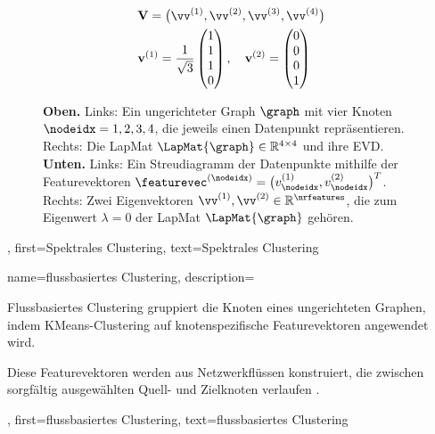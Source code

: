 {{{{{\begin{figure}[H]
\begin{center}
\begin{minipage}{0.4\textwidth}
				\end{minipage}
				\begin{minipage}{0.4\textwidth}
					\begin{align}
						& \mathbf{V} = \big( \vv^{(1)},\vv^{(2)},\vv^{(3)},\vv^{(4)} \big) \nonumber \\
						& \mathbf{v}^{(1)} = \frac{1}{\sqrt{3}} \begin{pmatrix} 1 \\ 1 \\ 1 \\ 0 \end{pmatrix}, \quad
						\mathbf{v}^{(2)} = \begin{pmatrix} 0 \\ 0 \\ 0 \\ 1 \end{pmatrix} \nonumber
					\end{align}
				\end{minipage}
				\caption{\label{fig_lap_mtx_specclustering_dict} 
					{\bf Oben.} Links: Ein ungerichteter \gls{Graph} $\graph$ mit vier Knoten $\nodeidx=1,2,3,4$, 
					die jeweils einen \gls{Datenpunkt} repräsentieren. Rechts: Die \gls{LapMat} 
					$\LapMat{\graph} \in \mathbb{R}^{4 \times 4}$ und ihre \gls{EVD}. 
					{\bf Unten.} Links: Ein \gls{Streudiagramm} der \gls{Datenpunkte} mithilfe der 
					\gls{Featurevektoren} $\featurevec^{(\nodeidx)} = \big( v^{(1)}_{\nodeidx}, v^{(2)}_{\nodeidx} \big)^T$. 
					Rechts: Zwei \gls{Eigenvektoren} $\vv^{(1)}, \vv^{(2)} \in \mathbb{R}^{\nrfeatures}$, 
					die zum \gls{Eigenwert} $\lambda = 0$ der \gls{LapMat} $\LapMat{\graph}$ gehören.
				}
			\end{center}
		\end{figure}
		\newpage
	},
	first={Spektrales Clustering},
	text={Spektrales Clustering}
}


{
	name={flussbasiertes Clustering},
	description={
		Flussbasiertes \gls{Clustering} gruppiert die Knoten eines 
		ungerichteten \gls{Graphen}, indem \gls{KMeans}-\gls{Clustering} auf knotenspezifische 
		\gls{Featurevektoren} angewendet wird. 
		
		Diese \gls{Featurevektoren} werden aus Netzwerkflüssen konstruiert, die zwischen sorgfältig 
		ausgewählten Quell- und Zielknoten verlaufen \cite{FlowSpecClustering2021}.
	},
	first={flussbasiertes Clustering},
	text={flussbasiertes Clustering}
}

}}}
